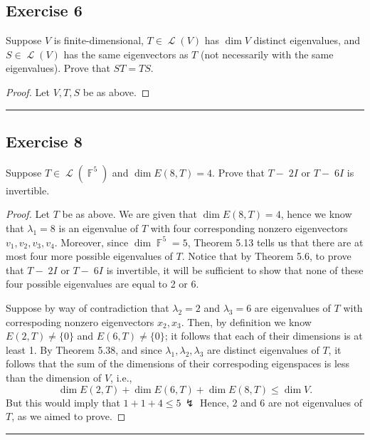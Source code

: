 \documentclass[letterpaper, 12pt]{amsart}
\DeclareMathOperator{\F}{\mathbb{F}}				%
\DeclareMathOperator{\Ell}{\mathscr{L}}				%
\theoremstyle{definition}  							%
\begin{document}
		\subsection*{Exercise 6}
		Suppose $V$ is finite-dimensional, $T \in \Ell(V)$ has $\dim V$ distinct eigenvalues, and $S \in \Ell(V)$ has the same eigenvectors as $T$ (not necessarily with the same eigenvalues). 
		Prove that $ST = TS$.
		\vspace*{3mm}

		\begin{proof}
		Let $V,T,S$ be as above.
		\end{proof}
		\vspace*{2mm}
		\hrule
		\vspace*{2mm}

		\subsection*{Exercise 8}
		Suppose $T \in \Ell(\F^{5})$ and $\dim{E(8, T)} = 4$.
		Prove that $T-􏰋2I$ or $T-􏰋6I$ is invertible.
		\vspace*{3mm}

		\begin{proof}
		Let $T$ be as above.
		We are given that $\dim{E(8, T)} = 4$, hence we know that $\lambda_{1} = 8$ is an eigenvalue of $T$ with four corresponding nonzero eigenvectors $v_{1}, v_{2}, v_{3}, v_{4}$.
		Moreover, since $\dim \F^{5} = 5$, Theorem 5.13 tells us that there are at most four more possible eigenvalues of $T$.
		Notice that by Theorem 5.6, to prove that $T-􏰋2I$ or $T-􏰋6I$ is invertible, it will be sufficient to show that none of these four possible eigenvalues are equal to 2 or 6.

		Suppose by way of contradiction that $\lambda_{2} = 2$ and $\lambda_{3} = 6$ are eigenvalues of $T$ with correspoding nonzero eigenvectors $x_{2}, x_{3}$.
		Then, by definition we know $E(2,T) \neq \{ 0 \}$ and $E(6,T) \neq \{ 0 \}$; it follows that each of their dimensions is at least 1.
		By Theorem 5.38, and since $\lambda_{1}, \lambda_{2}, \lambda_{3}$ are distinct eigenvalues of $T$, it follows that the sum of the dimensions of their correspoding eigenspaces is less than the dimension of $V$, i.e., $$\dim{E(2,T)} + \dim{E(6,T)} + \dim{E(8,T)} \leq \dim{V}.$$
		But this would imply that $1 + 1 + 4 \leq 5 \, \lightning$
		Hence, $2$ and $6$ are not eigenvalues of $T$, as we aimed to prove. 
		\end{proof}
		\vspace*{2mm}
		\hrule
		\vspace*{2mm}
\end{document}
